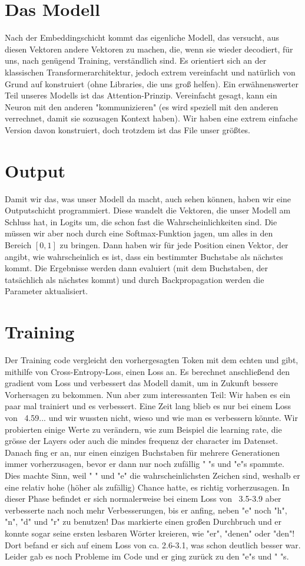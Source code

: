 \documentclass[12pt, letterpaper]{article}
\begin{document}
\section{Das Modell}
Nach der Embeddingschicht kommt das eigenliche Modell, das versucht, aus diesen Vektoren andere Vektoren zu machen, die, wenn sie wieder decodiert, für uns, nach genügend Training, verständlich sind. Es orientiert sich an der klassischen Transformerarchitektur, jedoch extrem vereinfacht und natürlich von Grund auf konstruiert (ohne Libraries, die uns groß helfen). Ein erwähnenswerter Teil unseres Modells ist das Attention-Prinzip. Vereinfacht gesagt, kann ein Neuron mit den anderen "kommunizieren" (es wird speziell mit den anderen verrechnet, damit sie sozusagen Kontext haben). Wir haben eine extrem einfache Version davon konstruiert, doch trotzdem ist das File unser größtes. 
\section{Output}
Damit wir das, was unser Modell da macht, auch sehen können, haben wir eine Outputschicht programmiert. Diese wandelt die Vektoren, die unser Modell am Schluss hat, in Logits um, die schon fast die Wahrscheinlichkeiten sind. Die müssen wir aber noch durch eine Softmax-Funktion jagen, um alles in den Bereich $[0, 1]$ zu bringen. Dann haben wir für jede Position einen Vektor, der angibt, wie wahrscheinlich es ist, dass ein bestimmter Buchstabe als nächstes kommt. Die Ergebnisse werden dann evaluiert (mit dem Buchstaben, der tatsächlich als nächstes kommt) und durch Backpropagation werden die Parameter aktualisiert. 

\section{Training}
Der Training code vergleicht den vorhergesagten Token mit dem echten und gibt, mithilfe von Cross-Entropy-Loss, einen Loss an. Es berechnet anschließend den gradient vom Loss und verbessert das Modell damit, um in Zukunft bessere Vorhersagen zu bekommen. Nun aber zum interessanten Teil: Wir haben es ein paar mal trainiert und es verbessert. Eine Zeit lang blieb es nur bei einem Loss von ~4.59... und wir wussten nicht, wieso und wie man es verbessern könnte. Wir probierten einige Werte zu verändern, wie zum Beispiel die learning rate, die grösse der Layers oder auch die mindes frequenz der character im Datenset. Danach fing er an, nur einen einzigen Buchstaben für mehrere Generationen immer vorherzusagen, bevor er dann nur noch zufällig " "s und "e"s spammte. Dies machte Sinn, weil " " und "e" die wahrscheinlichsten Zeichen sind, weshalb er eine relativ hohe (höher als zufällig) Chance hatte, es richtig vorherzusagen. In dieser Phase befindet er sich normalerweise bei einem Loss von ~3.5-3.9 aber verbesserte nach noch mehr Verbesserungen, bis er anfing, neben "e" noch "h", "n", "d" und "r" zu benutzen! Das markierte einen großen Durchbruch und er konnte sogar seine ersten lesbaren Wörter kreieren, wie "er", "denen" oder "den"! Dort befand er sich auf einem Loss von ca. 2.6-3.1, was schon deutlich besser war. Leider gab es noch Probleme im Code und er ging zurück zu den "e"s und " "s. 
\end{document}
